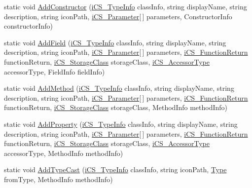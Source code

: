 \begin{DoxyCompactItemize}
\item 
static void \hyperlink{classi_c_s___library_database_a756fb03f37b2aab58a7169443435be4b}{Add\+Constructor} (\hyperlink{classi_c_s___type_info}{i\+C\+S\+\_\+\+Type\+Info} class\+Info, string display\+Name, string description, string icon\+Path, \hyperlink{classi_c_s___parameter}{i\+C\+S\+\_\+\+Parameter}\mbox{[}$\,$\mbox{]} parameters, Constructor\+Info constructor\+Info)
\item 
static void \hyperlink{classi_c_s___library_database_abc29e6b037ebcc5868ea53de607c0697}{Add\+Field} (\hyperlink{classi_c_s___type_info}{i\+C\+S\+\_\+\+Type\+Info} class\+Info, string display\+Name, string description, string icon\+Path, \hyperlink{classi_c_s___parameter}{i\+C\+S\+\_\+\+Parameter}\mbox{[}$\,$\mbox{]} parameters, \hyperlink{classi_c_s___function_return}{i\+C\+S\+\_\+\+Function\+Return} function\+Return, \hyperlink{i_c_s___storage_class_8cs_a4e1bb1da155050e4b0d0118f813194aa}{i\+C\+S\+\_\+\+Storage\+Class} storage\+Class, \hyperlink{i_c_s___accessor_type_8cs_ad7e8f7d8ee47401a5018d852892043d9}{i\+C\+S\+\_\+\+Accessor\+Type} accessor\+Type, Field\+Info field\+Info)
\item 
static void \hyperlink{classi_c_s___library_database_a3a98db26ac662817996ccf85ef566a57}{Add\+Method} (\hyperlink{classi_c_s___type_info}{i\+C\+S\+\_\+\+Type\+Info} class\+Info, string display\+Name, string description, string icon\+Path, \hyperlink{classi_c_s___parameter}{i\+C\+S\+\_\+\+Parameter}\mbox{[}$\,$\mbox{]} parameters, \hyperlink{classi_c_s___function_return}{i\+C\+S\+\_\+\+Function\+Return} function\+Return, \hyperlink{i_c_s___storage_class_8cs_a4e1bb1da155050e4b0d0118f813194aa}{i\+C\+S\+\_\+\+Storage\+Class} storage\+Class, Method\+Info method\+Info)
\item 
static void \hyperlink{classi_c_s___library_database_acb382323f8a8979cc8d495024bb5eb75}{Add\+Property} (\hyperlink{classi_c_s___type_info}{i\+C\+S\+\_\+\+Type\+Info} class\+Info, string display\+Name, string description, string icon\+Path, \hyperlink{classi_c_s___parameter}{i\+C\+S\+\_\+\+Parameter}\mbox{[}$\,$\mbox{]} parameters, \hyperlink{classi_c_s___function_return}{i\+C\+S\+\_\+\+Function\+Return} function\+Return, \hyperlink{i_c_s___storage_class_8cs_a4e1bb1da155050e4b0d0118f813194aa}{i\+C\+S\+\_\+\+Storage\+Class} storage\+Class, \hyperlink{i_c_s___accessor_type_8cs_ad7e8f7d8ee47401a5018d852892043d9}{i\+C\+S\+\_\+\+Accessor\+Type} accessor\+Type, Method\+Info method\+Info)
\item 
static void \hyperlink{classi_c_s___library_database_a42058df4be3ad8272578e36c62f4c2a3}{Add\+Type\+Cast} (\hyperlink{classi_c_s___type_info}{i\+C\+S\+\_\+\+Type\+Info} class\+Info, string icon\+Path, \hyperlink{i_c_s___object_type_enum_8cs_ae6c3dd6d8597380b56d94908eb431547aa1fa27779242b4902f7ae3bdd5c6d508}{Type} from\+Type, Method\+Info method\+Info)

\end{DoxyCompactItemize}
